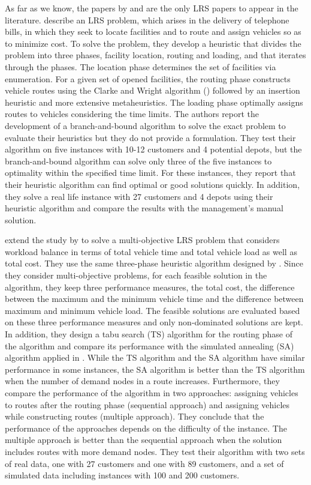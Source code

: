 As far as we know, the papers by \citet{Lin} and \citet{Lin2} are the only LRS papers to appear in the 
literature. \citet{Lin} describe an LRS problem, which arises in the delivery of telephone bills, in 
which they seek to locate facilities and to route and assign vehicles so as to minimize cost. 
To solve the problem, they develop a heuristic that divides the problem into three phases, facility 
location, routing and loading, and that iterates through the phases. The location phase determines the set 
of facilities via enumeration. For a given set of opened facilities, the routing phase constructs vehicle 
routes using the Clarke and Wright algorithm (\citet{Clarke}) followed by an insertion heuristic and 
more extensive metaheuristics. The loading phase optimally assigns routes to vehicles considering the 
time limits. The authors report the development of a branch-and-bound algorithm to solve the exact problem 
to evaluate their heuristics but they do not provide a formulation. They test their algorithm on five 
instances with 10-12 customers and 4 potential depots, but the branch-and-bound 
algorithm can solve only three of the five instances to optimality within the specified time 
limit. For these instances, they report that their heuristic algorithm can find optimal or good solutions 
quickly. In addition, they solve a real life instance with 27 customers and 4 depots using their
heuristic algorithm and compare the results with the management's manual solution. 


\citet{Lin2} extend the study by \citet{Lin} to solve a multi-objective LRS problem that considers
workload balance in terms of total vehicle time and total vehicle load as well as total cost. They
use the same three-phase heuristic algorithm designed by \citet{Lin}. Since they consider multi-objective
problems, for each feasible solution in the algorithm, they keep three performance measures, the total cost,
the difference between the maximum and the minimum vehicle time and the difference between maximum and minimum
vehicle load. The feasible solutions are evaluated based on these three performance measures and only non-dominated 
solutions are kept. In addition, they design a tabu search (TS) algorithm  for the routing phase of the algorithm and 
compare its performance with the simulated annealing (SA) algorithm applied in \citet{Lin}. While the TS algorithm
and the SA algorithm have similar performance in some instances, the SA algorithm is better than the TS algorithm
when the number of demand nodes in a route increases. Furthermore, 
they compare the performance of the algorithm in two approaches: assigning vehicles to routes after 
the routing phase (sequential approach) and assigning vehicles while constructing routes
(multiple approach). They conclude that the performance of the approaches depends on the difficulty
of the instance. The multiple approach is better than the sequential approach when the solution includes
routes with more demand nodes. 
They test their algorithm with two sets of real data, one with 27 customers and one with 89 customers, 
and a set of simulated data including instances with 100 and 200 customers. 


